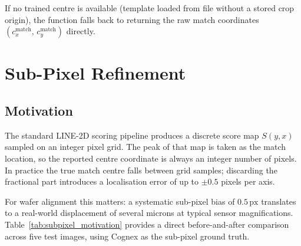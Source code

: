 \documentclass[12pt,a4paper]{article}
\begin{document}
If no trained centre is available (template loaded from file without a stored
crop origin), the function falls back to returning the raw match coordinates
$(c_x^\text{match},\, c_y^\text{match})$ directly.

\section{Sub-Pixel Refinement}
\label{sec:subpixel}

\subsection{Motivation}

The standard LINE-2D scoring pipeline produces a discrete score map
$S(y,x)$ sampled on an integer pixel grid.
The peak of that map is taken as the match location, so the reported
centre coordinate is always an integer number of pixels.
In practice the true match centre falls between grid samples; discarding
the fractional part introduces a localisation error of up to $\pm0.5$
pixels per axis.

For wafer alignment this matters: a systematic sub-pixel bias of
$0.5\,\text{px}$ translates to a real-world displacement of several
microns at typical sensor magnifications.  Table~\ref{tab:subpixel_motivation}
provides a direct before-and-after comparison across five test images,
using Cognex as the sub-pixel ground truth.
\end{document}
